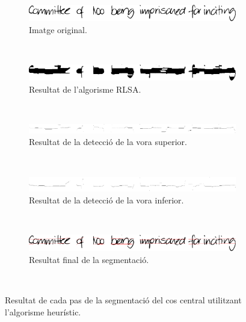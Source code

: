 \begin{figure}
\centering
\begin{subfigure}[b]{0.8\textwidth}
\centering
\includegraphics[width=\textwidth]{images/pasos_segmentacio_heuristica_original.eps}
\caption{Imatge original.}\label{fig:pasos_segmentacio_heuristica_original}
\end{subfigure} \\
\begin{subfigure}[b]{0.8\textwidth}
\centering
\includegraphics[width=\textwidth]{images/pasos_segmentacio_heuristica_rlsa.eps}
\caption{Resultat de l'algorisme RLSA.}\label{fig:pasos_segmentacio_heuristica_rlsa}
\end{subfigure}\\
\begin{subfigure}[b]{0.8\textwidth}
\centering
\includegraphics[width=\textwidth]{images/pasos_segmentacio_heuristica_vora_superior.eps}
\caption{Resultat de la detecció de la vora superior.}\label{fig:pasos_segmentacio_heuristica_sup}
\end{subfigure}\\
\begin{subfigure}[b]{0.8\textwidth}
\centering
\includegraphics[width=\textwidth]{images/pasos_segmentacio_heuristica_vora_inferior.eps}
\caption{Resultat de la detecció de la vora inferior.}\label{fig:pasos_segmentacio_heuristica_inf}
\end{subfigure}\\
\begin{subfigure}[b]{0.8\textwidth}
\centering
\includegraphics[width=\textwidth]{images/pasos_segmentacio_heuristica_final.eps}
\caption{Resultat final de la segmentació.}\label{fig:pasos_segmentacio_heuristica_final}
\end{subfigure}\\
\caption{Resultat de cada pas de la segmentació del cos central utilitzant l'algorisme heurístic.}\label{fig:pasos_segmentacio_heuristica}
\end{figure}

